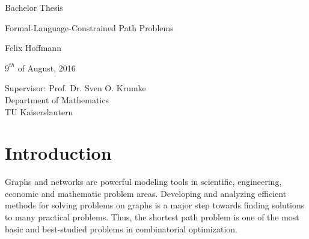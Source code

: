 \documentclass[]{article}
\numberwithin{equation}{section}
\begin{document}
\pagestyle{empty}

\begin{titlepage}
	
	\vspace*{2cm} 
	
	\begin{center} \large 
		
		Bachelor Thesis
		\vspace*{2cm}
 		
 		{\huge Formal-Language-Constrained Path Problems}
 		\vspace*{2.5cm}
 		
 		Felix Hoffmann
 		\vspace*{1.5cm}
 		
 		$9^{th}$ of August, 2016
 		\vspace*{4.5cm}
 		
 		
 		Supervisor: Prof. Dr. Sven O. Krumke \\[1cm]
 		Department of Mathematics \\[1cm]
 		TU Kaiserslautern
 		
 	\end{center}
\end{titlepage}

\tableofcontents

\newpage

\pagestyle{headings}

\section{Introduction}
\label{sec:intro}

Graphs and networks are powerful modeling tools in scientific, engineering, economic and mathematic problem areas. Developing and analyzing efficient methods for solving problems on graphs is a major step towards finding solutions to many practical problems. Thus, the shortest path problem is one of the most basic and best-studied problems in combinatorial optimization.\\
\end{document}
